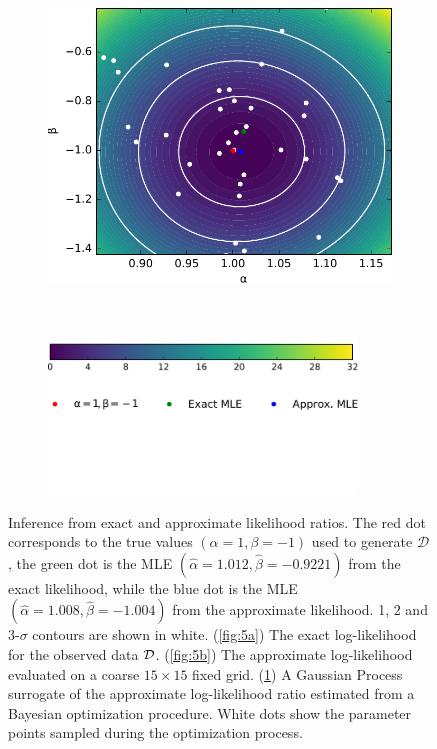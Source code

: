\documentclass[12pt]{article}
\numberwithin{equation}{section}
\theoremstyle{plain}
\begin{document}
\begin{figure}
    \begin{subfigure}[t]{0.43\textwidth}
        \centering
        \includegraphics[width=\textwidth]{figures/fig5c.pdf}
        \caption{ }
        \label{fig:5c}
    \end{subfigure}
    ~
    \begin{subfigure}[t]{0.43\textwidth}
        \centering
        \hfill\includegraphics[width=0.9\textwidth]{figures/fig5d.pdf}
        \caption{ }
        \label{fig:5d}
    \end{subfigure}
    \caption{Inference from exact and approximate likelihood ratios. The red dot corresponds
    to the true values $(\alpha=1, \beta=-1)$ used to generate $\mathcal{D}$, the green dot is the MLE
    $(\hat \alpha=1.012, \hat \beta=-0.9221)$  from the exact likelihood, while the blue dot is the MLE $(\hat \alpha=1.008, \hat \beta=-1.004)$ from the approximate likelihood.
    1, 2 and 3-$\sigma$ contours are shown in white.
             (\ref{fig:5a}) The exact log-likelihood for the observed data ${\cal D}$.
             (\ref{fig:5b}) The approximate log-likelihood  evaluated on a coarse $15 \times 15$ fixed grid.
             (\ref{fig:5c}) A Gaussian Process surrogate of the approximate log-likelihood ratio estimated from a Bayesian optimization procedure. White dots show the  parameter points sampled during the optimization process.}
    \label{fig:5}
\end{figure}
\end{document}
